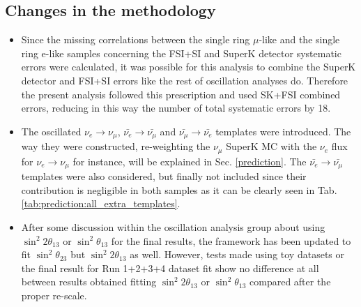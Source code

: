 \subsection{Changes in the methodology}

\begin{itemize}

\item{Since the missing correlations between the single ring $\mu$-like and the single ring e-like samples concerning the FSI+SI and SuperK detector systematic errors were calculated, it was possible for this analysis to combine the SuperK detector and FSI+SI errors like the rest of oscillation analyses do. Therefore the present analysis followed this prescription and used SK+FSI combined errors, reducing in this way the number of total systematic errors by 18.}

\item{The oscillated $\nu_{e} \rightarrow \nu_{\mu}$,  $\bar{\nu_{e}} \rightarrow \bar{\nu_{\mu}}$ and $\bar{\nu_{\mu}} \rightarrow \bar{\nu_{e}}$ templates were introduced. The way they were constructed, re-weighting the $\nu_{\mu}$ SuperK MC with the $\nu_{e}$ flux for $\nu_{e} \rightarrow \nu_{\mu}$ for instance, will be explained in Sec. \ref{prediction}. The $\bar{\nu_{e}} \rightarrow \bar{\nu_{\mu}}$ templates were also considered, but finally not included since their contribution is negligible in both samples as it can be clearly seen in Tab. \ref{tab:prediction:all_extra_templates}.}

\item{After some discussion within the oscillation analysis group about using $\sin^{2}2\theta_{13}$ or $\sin^{2}\theta_{13}$ for the final results, the framework has been updated to fit $\sin^{2}\theta_{23}$ but $\sin^{2}2\theta_{13}$ as well. However, tests made using toy datasets or the final result for Run 1+2+3+4 dataset fit show no difference at all between results obtained fitting $\sin^{2}2\theta_{13}$ or $\sin^{2}\theta_{13}$ compared after the proper re-scale.}

\end{itemize}



